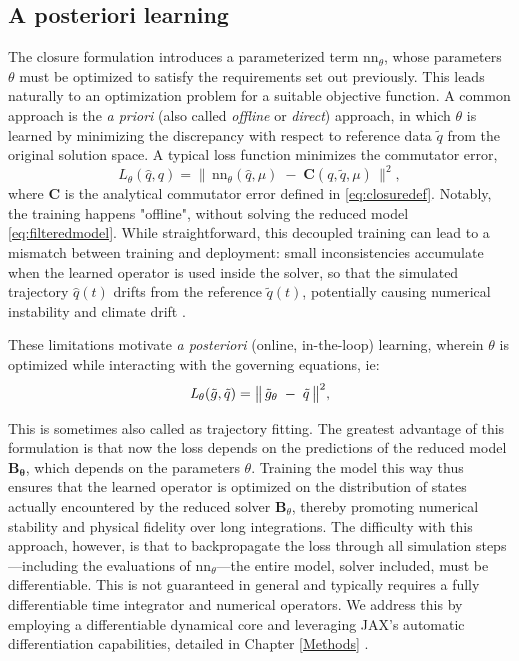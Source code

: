 \subsection{A posteriori learning}
The closure formulation introduces a parameterized term \(\mathrm{nn}_{\theta}\), whose parameters \(\theta\) must be optimized to satisfy the requirements set out previously. This leads naturally to an optimization problem for a suitable objective function. A common approach is the \emph{a priori} (also called \emph{offline} or \emph{direct}) approach, in which \(\theta\) is learned by minimizing the discrepancy with respect to reference data \(\tilde{q}\) from the original solution space. A typical loss function minimizes the commutator error,
\begin{equation}
    \label{eq:apriori}
    \textit{L}_{\theta}(\hat{q}, q)
    = \big\|\, \mathrm{nn}_{\theta}(\hat{q}, \mu) \;-\; \mathbf{C}(q, \tilde{q}, \mu) \,\big\|^{2},
\end{equation}
where \(\mathbf{C}\) is the analytical commutator error defined in \eqref{eq:closuredef}. Notably, the training happens "offline", without solving the reduced model \eqref{eq:filteredmodel}. While straightforward, this decoupled training can lead to a mismatch between training and deployment: small inconsistencies accumulate when the learned operator is used inside the solver, so that the simulated trajectory \(\hat{q}(t)\) drifts from the reference \(\tilde{q}(t)\), potentially causing numerical instability and climate drift \cite{kurz2021investigating,brenowitz2019spatially}. 

These limitations motivate \emph{a posteriori} (online, in-the-loop) learning, wherein \(\theta\) is optimized while interacting with the governing equations, ie:
\begin{equation}
    \label{eq:aposteriori}
    \textit{L}_{\theta}(\Tilde{g}, \Tilde{q})
    = \big\| \, \Tilde{g}_{\theta} \;-\; \Tilde{q} \,\big\|^{2},
\end{equation}

This is sometimes also called as trajectory fitting. The greatest advantage of this formulation is that now the loss depends on the predictions of the reduced model $\boldsymbol{B_{\theta}}$, which depends on the parameters $\theta$. Training the model this way thus ensures that the learned operator is optimized on the distribution of states actually encountered by the reduced solver \(\mathbf{B}_{\theta}\), thereby promoting numerical stability and physical fidelity over long integrations. The difficulty with this approach, however, is that to backpropagate the loss through all simulation steps—including the evaluations of \(\mathrm{nn}_{\theta}\)—the entire model, solver included, must be differentiable. This is not guaranteed in general and typically requires a fully differentiable time integrator and numerical operators. We address this by employing a differentiable dynamical core and leveraging JAX’s automatic differentiation capabilities, detailed in Chapter \ref{Methods} \cite{neuralgcm,jax}.


